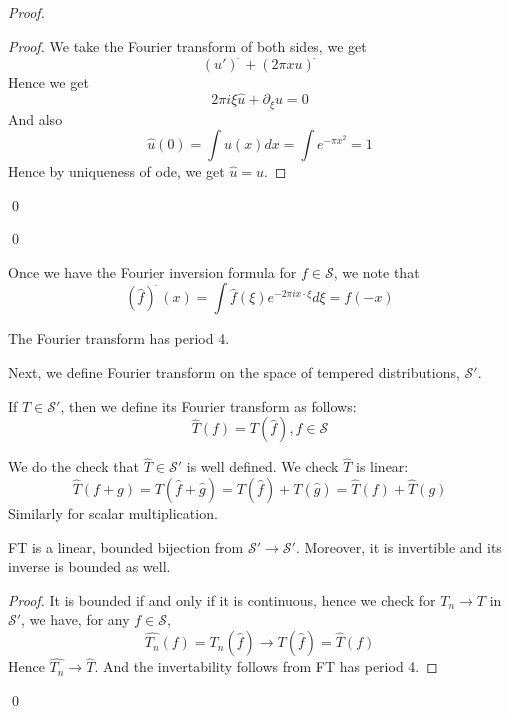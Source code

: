 \begin{proof}
\begin{proof}
        We take the Fourier transform of both sides, we get
        \begin{equation*}
            (u')^{\widehat{\phantom{.}}}+(2\pi xu)^{\widehat{\phantom{.}}}
        \end{equation*}
        Hence we get
        \begin{equation*}
            2\pi i\xi\hat{u}+\partial_\xi u=0
        \end{equation*}
        And also
        \begin{equation*}
            \hat{u}(0)=\int u(x)dx=\int e^{-\pi x^2}=1
        \end{equation*}
        Hence by uniqueness of ode, we get $\hat{u}=u$.
    \end{proof}
    \qed
\end{proof}
\qed

Once we have the Fourier inversion formula for $f\in\mathcal{S}$, we note that
\begin{equation*}
    (\hat{f})^{\widehat{\phantom{.}}}(x)=\int \hat{f}(\xi)e^{-2\pi ix\cdot\xi}d\xi=f(-x)
\end{equation*}
\begin{corollary}
    The Fourier transform has period 4.
\end{corollary}

Next, we define Fourier transform on the space of tempered distributions, $\mathcal{S}'$.
\begin{definition}
    If $T\in\mathcal{S}'$, then we define its Fourier transform as follows:
    \begin{equation*}
        \hat{T}(f)=T(\hat{f}), f\in\mathcal{S}
    \end{equation*}
\end{definition}
We do the check that $\hat{T}\in\mathcal{S}'$ is well defined. We check $\hat{T}$ is linear:
\begin{equation*}
    \hat{T}(f+g)=T(\hat{f}+\hat{g})=T(\hat{f})+T(\hat{g})=\hat{T}(f)+\hat{T}(g)
\end{equation*}
Similarly for scalar multiplication.

\begin{theorem}
    FT is a linear, bounded bijection from $\mathcal{S}'\to\mathcal{S}'$. Moreover, it is invertible and its inverse is bounded as well.
\end{theorem}
\begin{proof}
    It is bounded if and only if it is continuous, hence we check for $T_n\to T$ in $\mathcal{S}'$, we have, for any $f\in\mathcal{S}$,
    \begin{equation*}
        \hat{T_n}(f)=T_n(\hat{f})\to T(\hat{f})=\hat{T}(f)
    \end{equation*}
    Hence $\hat{T_n}\to\hat{T}$. And the invertability follows from FT has period 4. 
\end{proof}
\qed

